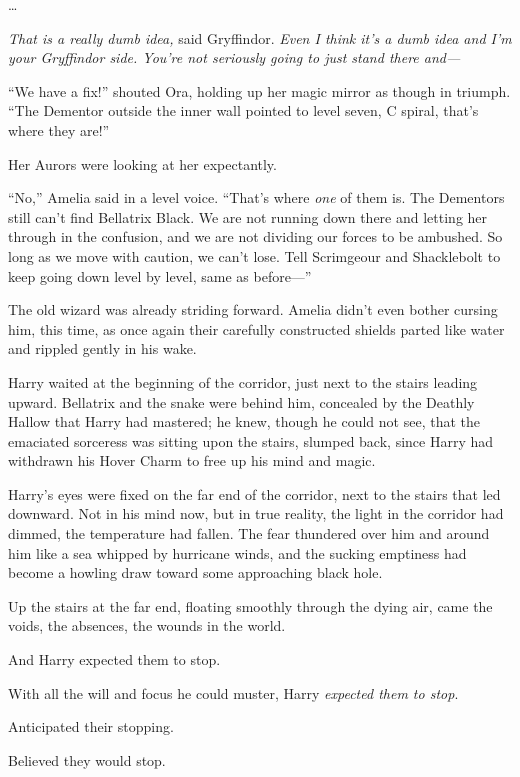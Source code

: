 …

\emph{That is a really dumb idea,} said Gryffindor. \emph{Even I think it’s a dumb idea and I’m your Gryffindor side. You’re not seriously going to just stand there and—}

\later

“We have a fix!” shouted Ora, holding up her magic mirror as though in triumph.
“The Dementor outside the inner wall pointed to level seven, C spiral, that’s where they are!”

Her Aurors were looking at her expectantly.

“No,” Amelia said in a level voice.
“That’s where \emph{one} of them is. The Dementors still can’t find Bellatrix Black. We are not running down there and letting her through in the confusion, and we are not dividing our forces to be ambushed. So long as we move with caution, we can’t lose. Tell Scrimgeour and Shacklebolt to keep going down level by level, same as before—”

The old wizard was already striding forward. Amelia didn’t even bother cursing him, this time, as once again their carefully constructed shields parted like water and rippled gently in his wake.

\later

Harry waited at the beginning of the corridor, just next to the stairs leading upward. Bellatrix and the snake were behind him, concealed by the Deathly Hallow that Harry had mastered; he knew, though he could not see, that the emaciated sorceress was sitting upon the stairs, slumped back, since Harry had withdrawn his Hover Charm to free up his mind and magic.

Harry’s eyes were fixed on the far end of the corridor, next to the stairs that led downward. Not in his mind now, but in true reality, the light in the corridor had dimmed, the temperature had fallen. The fear thundered over him and around him like a sea whipped by hurricane winds, and the sucking emptiness had become a howling draw toward some approaching black hole.

Up the stairs at the far end, floating smoothly through the dying air, came the voids, the absences, the wounds in the world.

And Harry expected them to stop.

With all the will and focus he could muster, Harry \emph{expected them to stop}.

Anticipated their stopping.

Believed they would stop.

